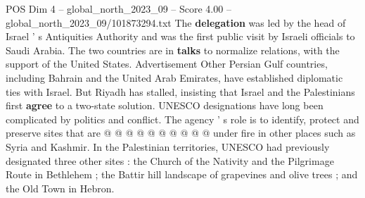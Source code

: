 \begin{textsample}{POS Dim 4 – global\_north\_2023\_09 – Score 4.00 – global\_north\_2023\_09/101873294.txt}
The \textbf{delegation} was led by the head of Israel ' s Antiquities Authority and was the first public visit by Israeli officials to Saudi Arabia.
The two countries are in \textbf{talks} to normalize relations, with the support of the United States.
Advertisement Other Persian Gulf countries, including Bahrain and the United Arab Emirates, have established diplomatic ties with Israel.
But Riyadh has stalled, insisting that Israel and the Palestinians first \textbf{agree} to a two-state solution.
UNESCO designations have long been complicated by politics and conflict.
The agency ' s role is to identify, protect and preserve sites that are @ @ @ @ @ @ @ @ @ @ under fire in other places such as Syria and Kashmir.
In the Palestinian territories, UNESCO had previously designated three other sites : the Church of the Nativity and the Pilgrimage Route in Bethlehem ; the Battir hill landscape of grapevines and olive trees ; and the Old Town in Hebron.

\end{textsample}
